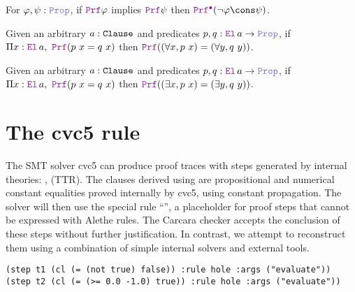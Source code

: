 \begin{lemma}[$\kw{subproof}_1$]\label{lem:subproof}
For $\varphi, \psi : \prop{}$, if $\prf{} \varphi$ implies $\prf{} \psi$ then $\pid (\neg \varphi \cons \psi)$.
\end{lemma}


\begin{lemma}\label{lem:bind-forall}
Given an arbitrary $a : \texttt{\upshape{Clause}}$ and predicates $p, q : \el{}\,a \ra \prop$, if $\Pi x : \el{}\,a,~ \prf (p~x = q~x)$ then $\prf ((\forall x, p~x) = (\forall y, q~y))$.
\end{lemma}


\begin{lemma}\label{lem:bind-exists}
  Given an arbitrary $a : \texttt{\upshape{Clause}}$ and predicates $p, q : \el{}\,a \ra \prop$, if $\Pi x : \el{}\,a,~ \prf (p~x = q~x)$ then $\prf ((\exists x, p~x) = (\exists y, q~y))$.
\end{lemma}



\section{The \texttt{} cvc5 rule}
\label{ssec:eval-recon}

The SMT solver cvc5 can produce proof traces with steps generated by internal theories: ,  (TTR).
The clauses derived using  are propositional and numerical constant equalities proved internally by cvc5, using constant propagation.
The solver will then use the special rule ``'', a placeholder for proof steps that cannot be expressed with Alethe rules.
The Carcara checker accepts the conclusion of these  steps without further justification.
In contrast, we attempt to reconstruct them using a combination of simple internal solvers and external tools.

\smallskip

\begin{lstlisting}[language=SMT,caption={An example of proof trace using the cvc5 $\kw{evaluate}$ rule.},label={lst:eval-step}]
(step t1 (cl (= (not true) false)) :rule hole :args ("evaluate"))
(step t2 (cl (= (>= 0.0 -1.0) true)) :rule hole :args ("evaluate"))
\end{lstlisting}

\smallskip

